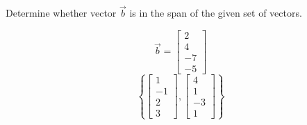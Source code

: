 \documentclass{ximera}
\begin{document}
 \begin{problem}\label{prob:spanofvect3}
Determine whether vector $\vec{b}$ is in the span of the given set of vectors.
 
 $$\vec{b}=\begin{bmatrix}2\\4\\-7\\-5\end{bmatrix}$$ 
 $$\left\{\begin{bmatrix}1\\-1\\2\\3\end{bmatrix}, \begin{bmatrix}4\\1\\-3\\1\end{bmatrix}\right\}$$
 \begin{multipleChoice}
 \end{multipleChoice}
 \end{problem}
 
\end{document}
